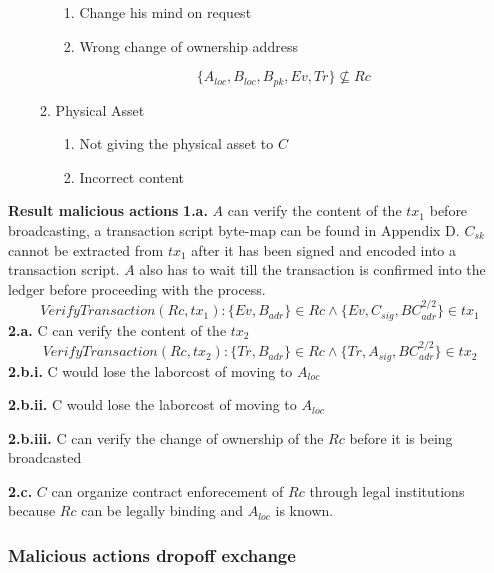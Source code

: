 \begin{enumerate}
\begin{enumerate}
\begin{enumerate}
      \item Change his mind on request
      \item Wrong change of ownership address
    \end{enumerate}
    \[\{A_{loc}, B_{loc}, B_{pk}, Ev, Tr\} \not\subseteq Rc\]
    \item Physical Asset
    \begin{enumerate}
      \item Not giving the physical asset to $C$
      \item Incorrect content
    \end{enumerate}
  \end{enumerate}
\end{enumerate}

\bigbreak
\noindent\textbf{Result malicious actions}
\bigbreak
\noindent\textbf{1.a.} $A$ can verify the content of the $tx_1$ before broadcasting, a transaction script byte-map can be found in Appendix D. $C_{sk}$ cannot be extracted from $tx_1$ after it has been signed and encoded into a transaction script. $A$ also has to wait till the transaction is confirmed into the ledger before proceeding with the process.
\[VerifyTransaction(Rc, tx_1)\colon \{Ev, B_{adr}\} \in Rc \land \{Ev, C_{sig},  BC_{adr}^{2/2}\} \in tx_1\]
\noindent\textbf{2.a.} C can verify the content of the $tx_2$
\[VerifyTransaction(Rc, tx_2)\colon\{Tr, B_{adr}\} \in Rc \land \{Tr, A_{sig}, BC_{adr}^{2/2}\} \in tx_2\]
\noindent\textbf{2.b.i.} C would lose the laborcost of moving to $A_{loc}$ \par
\noindent\textbf{2.b.ii.} C would lose the laborcost of moving to $A_{loc}$ \par
\noindent\textbf{2.b.iii.} C can verify the change of ownership of the $Rc$ before it is being broadcasted \par
\noindent\textbf{2.c.} $C$ can organize contract enforecement of $Rc$ through legal institutions because $Rc$ can be legally binding and $A_{loc}$ is known. \par

\subsubsection{Malicious actions dropoff exchange}

